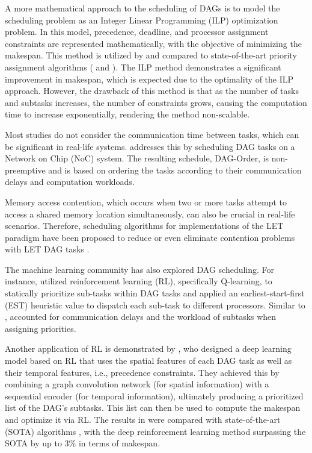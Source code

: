 A more mathematical approach to the scheduling of DAGs is to model 
the scheduling problem as an Integer Linear Programming (ILP) 
optimization problem. In this model, precedence, deadline, and 
processor assignment constraints are represented mathematically, 
with the objective of minimizing the makespan. This method is 
utilized by \cite{ChangMinWRCTBoundILP2022} and compared to 
state-of-the-art priority assignment algorithms (\cite{he2019intra} 
and \cite{zhao2020dag}). The ILP method demonstrates a significant 
improvement in makespan, which is expected due to the optimality of 
the ILP approach. However, the drawback of this method is that as 
the number of tasks and subtasks increases, the number of 
constraints grows, causing the computation time to increase 
exponentially, rendering the method non-scalable.

Most studies do not consider the communication time between tasks, 
which can be significant in real-life systems. 
\cite{ChenDAGorder2023} addresses this by scheduling DAG tasks on a 
Network on Chip (NoC) system. The resulting schedule, DAG-Order, 
is non-preemptive and is based on ordering the tasks according to 
their communication delays and computation workloads.

Memory access contention, which occurs when two or more tasks 
attempt to access a shared memory location simultaneously, can 
also be crucial in real-life scenarios. Therefore, scheduling 
algorithms for implementations of the LET paradigm have been 
proposed to reduce or even eliminate contention problems with LET 
DAG tasks \cite{Yano2021ContentionFree}\cite{Igarashi2020HeuristicContFree}.
\newline


The machine learning community has also explored DAG scheduling. 
For instance, \cite{yano2021work} utilized reinforcement 
learning (RL), specifically Q-learning, to statically prioritize 
sub-tasks within DAG tasks and applied an 
earliest-start-first (EST) heuristic value to dispatch each 
sub-task to different processors. Similar to \cite{ChenDAGorder2023}, 
\cite{yano2021work} accounted for communication delays and the 
workload of subtasks when assigning priorities.

Another application of RL is demonstrated by 
\cite{lee2021DAGDeeplearning}, who designed a deep learning model 
based on RL that uses the spatial features of each DAG task as well 
as their temporal features, i.e., precedence constraints. They 
achieved this by combining a graph convolution network 
(for spatial information) with a sequential encoder 
(for temporal information), ultimately producing a prioritized list 
of the DAG's subtasks. This list can then be used to compute 
the makespan and optimize it via RL. The results in 
\cite{lee2021DAGDeeplearning} were compared with state-of-the-art (SOTA) 
algorithms \cite{he2019intra}\cite{zhao2020dag}, with the deep 
reinforcement learning method surpassing the SOTA by up to 3\% 
in terms of makespan.

